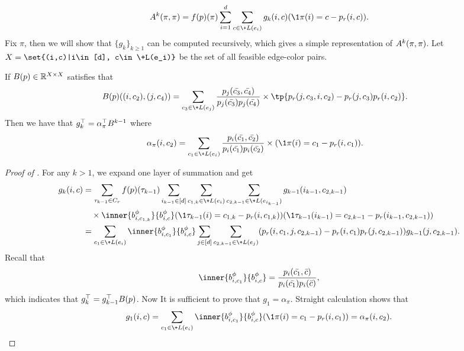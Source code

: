 \documentclass[a4paper,11pt]{article}
\begin{document}
\begin{align}\label{eq:trace_of_A}
    \*A^k(\pi,\pi) = f(\*p)(\pi)\sum_{i=1}^d
    \sum_{c\in \+L(e_i)} g_k(i,c) (\1{\pi(i) = c} -  \*p_r(i,c)).
\end{align}
Fix $\pi$, then we will show that $\{g_k\}_{k\geq 1}$ can be computed recursively, which gives a simple representation of $\*A^k(\pi,\pi)$. Let $X=\set{(i,c)|i\in [d], c\in \+L(e_i)}$ be the set of all feasible edge-color pairs. 
\begin{lemma}\label{lem:recursion_for_g}
    If $\*B(\*p)\in \mathbb R^{X\times X}$ satisfies that
    \begin{align*}
        \*B(\*p)((i,c_2),(j,c_4)) &= 
        \sum_{c_3 \in \+L(e_j)}
        \frac{\*p_j(\bar{c_3},\bar{c_4})}{\*p_j(\bar{c_3})\*p_j(\bar{c_4})}\times \tp{\*p_r(j,c_3,i,c_2) - \*p_r(j,c_3)\*p_r(i,c_2)}.
    \end{align*}
    Then we have that $g_k^\top = \alpha^\top_\pi \*B^{k-1}$ where
    \begin{align*}
        \alpha_\pi(i,c_2) &= \sum_{c_1 \in \+L(e_i)}
         \frac{\*p_i(\bar{c_1},\bar{c_2})}{\*p_i(\bar{c_1})\*p_i(\bar{c_2})}
        \times (\1{\pi(i) = c_1} - \*p_r(i,c_1)).
    \end{align*}
\end{lemma}
\begin{proof}[Proof of ]
    For any $k > 1$, we expand one layer of summation and get
    \begin{align*}
        g_k(i,c) &= \sum_{\tau_{k-1}\in C_r} f(\*p)(\tau_{k-1})\sum_{i_{k-1}\in [d]} \sum_{c_{1,k}\in \+L(e_i)} \sum_{c_{2,k-1}\in \+L(e_{i_{k-1}})}
        g_{k-1}(i_{k-1},c_{2,k-1}) 
        \\&\quad\times \inner{\*b_{i,c_{1,k}}^\phi}{\*b_{i,c}^\phi}(\1{\tau_{k-1}(i) = c_{1,k}} - \*p_r(i,c_{1,k}))
        (\1{\tau_{k-1}(i_{k-1}) = c_{2,k-1}} - \*p_r(i_{k-1}, c_{2,k-1}))
        \\&= \sum_{c_1\in \+L(e_i)}\inner{\*b_{i,c_1}^\phi}{\*b_{i,c}^\phi}\sum_{j\in[d]}\sum_{c_{2,k-1}\in \+L(e_{j})}(\*p_r(i,c_1,j,c_{2,k-1})-\*p_r(i,c_1)\*p_r(j,c_{2,k-1})) g_{k-1}(j,c_{2,k-1}).
    \end{align*}
    Recall that
    $$ 
        \inner{\*b_{i,c_1}^\phi}{\*b_{i,c}^\phi} = 
        \frac{\*p_i(\bar{c_1},\bar{c})}{\*p_i(\bar{c_1})\*p_i(\bar{c})},
    $$
    which indicates that $g_k^\top = g_{k-1}^\top \*B(\*p)$.
    Now It is sufficient to prove that $g_1 = \alpha_{\pi}$.
    Straight calculation shows that
    \begin{equation*}
        g_1(i,c) = \sum_{c_1\in \+L(e_i)} \inner{\*b_{i,c_1}^\phi}{\*b_{i,c}^\phi}(\1{\pi(i) = c_1} - \*p_r(i,c_1)) = \alpha_\pi(i,c_2).
        \qedhere
    \end{equation*}
\end{proof}
\end{document}
